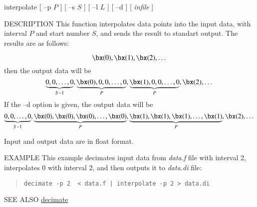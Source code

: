 \begin{synopsis}
\item[interpolate] [ --p $P$ ] [ --s $S$ ] [ --l $L$ ] [ --d ] [ {\em infile} ]
\end{synopsis}

\begin{qsection}{DESCRIPTION}
This function interpolates data points into the input data, with
interval $P$ and start number $S$, and sends the result to standart
output. The results are as follows:

\begin{displaymath}
 \bx(0), \bx(1), \bx(2), \dots
\end{displaymath}
then the output data will be
\begin{displaymath}
\underbrace{0, 0, \dots, 0}_{S-1},\underbrace{\bx(0), 0, 0, \dots, 0}_{P},\underbrace{\bx(1), 0, 0, \dots, 0}_{P},\bx(2), \dots
\end{displaymath}
If the --d option is given, the output data will be
\begin{displaymath}
\underbrace{0, 0, \dots, 0}_{S-1},\underbrace{\bx(0), \bx(0), \bx(0), \dots, \bx(0)}_{P},\underbrace{\bx(1), \bx(1), \bx(1), \dots, \bx(1)}_{P},\bx(2), \dots
\end{displaymath}
\par
Input and output data are in float format.
\end{qsection}

\begin{options}
\end{options}

\begin{qsection}{EXAMPLE}
This example decimates input data from {\em data.f} file with interval 2,
interpolates 0 with interval 2, and then outputs it to {\em
data.di} file:
\begin{quote}
  \verb!decimate -p 2  < data.f | interpolate -p 2 > data.di!
\end{quote}
\end{qsection}

\begin{qsection}{SEE ALSO}
\hyperlink{decimate}{decimate}
\end{qsection}
